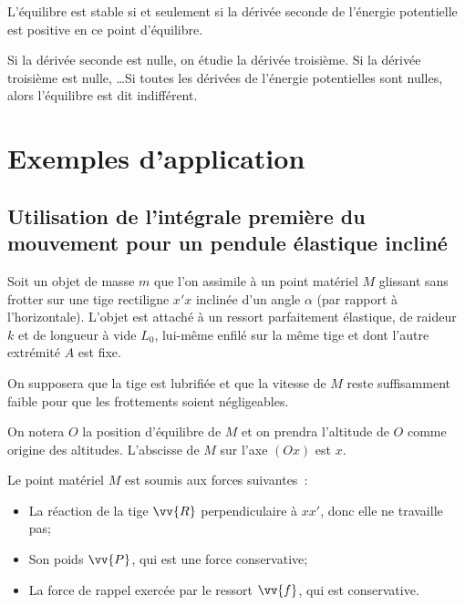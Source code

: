 L'équilibre est stable si et seulement si la dérivée seconde de l'énergie 
potentielle est positive en ce point d'équilibre.

Si la dérivée seconde est nulle, on étudie la dérivée troisième. Si la dérivée 
troisième est nulle, \ldots Si toutes les dérivées de l'énergie potentielles 
sont nulles, alors l'équilibre est dit indifférent.

\section{Exemples d'application}%
\label{chap4-sec:exemplesdapplication}%

\subsection{Utilisation de l'intégrale première du mouvement pour un pendule 
élastique incliné}%
\label{chap4-subsec:penduleelastique}%

Soit un objet de masse \(m\) que l'on assimile à un point matériel \(M\) 
glissant sans frotter sur une tige rectiligne \(x'x\) inclinée d'un angle 
\(\alpha\) (par rapport à l'horizontale). L'objet est attaché à un ressort 
parfaitement élastique, de raideur \(k\) et de longueur à vide \(L_0\), 
lui-même enfilé sur la même tige et dont l'autre extrémité \(A\) est fixe.

On supposera que la tige est lubrifiée et que la vitesse de \(M\) reste 
suffisamment faible pour que les frottements soient négligeables.

On notera \(O\) la position d'équilibre de \(M\) et on prendra l'altitude de 
\(O\) comme origine des altitudes. L'abscisse de \(M\) sur l'axe \((Ox)\) est 
\(x\).

Le point matériel \(M\) est soumis aux forces suivantes~:
\begin{itemize}%
\item La réaction de la tige \(\vv{R}\) perpendiculaire à \(xx'\), donc elle ne 
  travaille pas;
\item Son poids \(\vv{P}\), qui est une force conservative;
\item La force de rappel exercée par le ressort \(\vv{f}\), qui est 
  conservative.
\end{itemize}%

